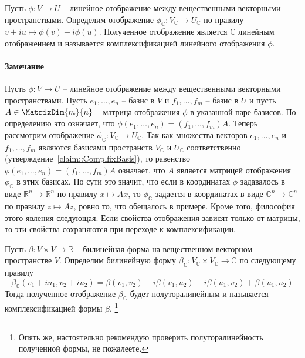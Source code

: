 \begin{definition}
Пусть $\phi\colon V\to U$ -- линейное отображение между вещественными векторными пространствами.
Определим отображение $\phi_\mathbb C\colon V_\mathbb C\to U_\mathbb C$ по правилу $v+iu \mapsto \phi(v) + i\phi(u)$.
Полученное отображение является $\mathbb C$ линейным отображением и называется комплексификацией линейного отображения $\phi$.
\end{definition}

\paragraph{Замечание}

Пусть $\phi\colon V\to U$ -- линейное  отображение между вещественными векторными пространствами.
Пусть $e_1,\ldots,e_n$ -- базис в $V$ и $f_1,\ldots,f_m$ -- базис в $U$ и пусть $A\in \MatrixDim{m}{n}$ -- матрица отображения $\phi$ в указанной паре базисов.
По определению это означает, что $\phi(e_1,\ldots,e_n) = (f_1,\ldots,f_m)A$.
Теперь рассмотрим отображение $\phi_\mathbb C \colon V_\mathbb C\to U_\mathbb C$.
Так как множества векторов $e_1,\ldots,e_n$ и $f_1,\ldots,f_m$ являются базисами пространств $V_\mathbb C$ и $U_\mathbb C$ соответственно (утверждение~\ref{claim::ComplfixBasis}), то равенство $\phi(e_1,\ldots,e_n) = (f_1,\ldots,f_m)A$ означает, что $A$ является матрицей отображения $\phi_\mathbb C$ в этих базисах.
По сути это значит, что если в координатах $\phi$ задавалось в виде $\mathbb R^n \to \mathbb R^n$ по правилу $x \mapsto Ax$, то $\phi_\mathbb C$ задается в координатах в виде $\mathbb C^n \to \mathbb C^n$ по правилу $z\mapsto Az$, ровно то, что обещалось в примере.
Кроме того, философия этого явления следующая.
Если свойства отображения зависят только от матрицы, то эти свойства сохраняются при переходе к комплексификации.


\begin{definition}
\label{definition::ComplfixBil}
Пусть $\beta\colon V\times V\to \mathbb R$ -- билинейная форма на вещественном векторном пространстве $V$.
Определим билинейную форму $\beta_\mathbb C \colon V_\mathbb C\times V_\mathbb C\to \mathbb C$ по следующему правилу
\[
\beta_\mathbb C(v_1+iu_1, v_2 + iu_2) = \beta(v_1, v_2) + i\beta(v_1,u_2) - i\beta(u_1, v_2) + \beta(u_1, u_2)
\]
Тогда полученное отображение $\beta_\mathbb C$ будет полуторалинейным и называется комплексификацией формы $\beta$.%
\footnote{Опять же, настоятельно рекомендую проверить полуторалинейность полученной формы, не пожалеете.}
\end{definition}


